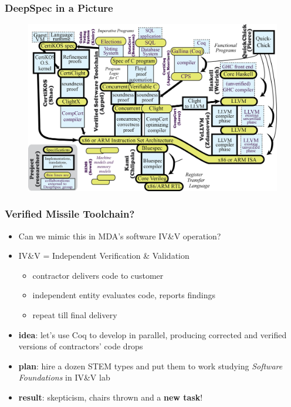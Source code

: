\documentclass[
        11pt, %
]{beamer}
\begin{document}
\begin{frame}
    \frametitle{DeepSpec in a Picture}
        \begin{figure}
            \includegraphics[width=.9\linewidth]{SpecBox.png}
        \end{figure}
\end{frame}

\begin{frame}
    \frametitle{Verified Missile Toolchain?}
        \begin{itemize}
            \item Can we mimic this in MDA's software IV\&V operation?
            \item IV\&V = Independent Verification \& Validation
            \begin{itemize}
                \item contractor delivers code to customer
                \item independent entity evaluates code, reports findings
                \item repeat till final delivery
            \end{itemize}
            \item {\bf idea}: let's use Coq to develop in parallel, producing corrected and verified versions of contractors' code drops
            \item {\bf plan}: hire a dozen STEM types and put them to work studying \emph{Software Foundations} in IV\&V lab
            \item {\bf result}: skepticism, chairs thrown and a {\bf new task}!
        \end{itemize}
\end{frame}
\end{document}
